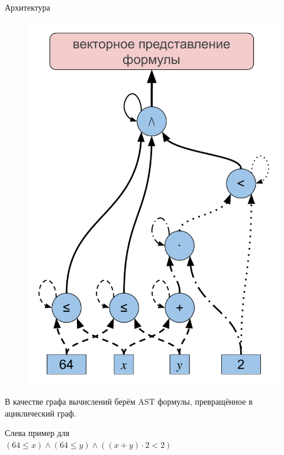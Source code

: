 \documentclass[14pt,aspectratio=169,hyperref={pdftex,unicode},xcolor=dvipsnames]{beamer}
\renewcommand{\le}{\leqslant}
\begin{document}
\begin{frame}{Архитектура}

\begin{minipage}{0.5\textwidth}

\begin{figure}[ht]
\begin{center}
  \includegraphics[scale=0.37]{./assets/formula-ast-talk.pdf}
\end{center}
\end{figure}

\end{minipage}%
\begin{minipage}{0.5\textwidth}

В качестве графа вычислений берём AST формулы, превращённое в ациклический граф.

Слева пример для \\ {\small $(64 \le x) \wedge (64 \le y) \wedge ((x + y) \cdot 2 < 2)$}

\end{minipage}

\end{frame}
\end{document}
